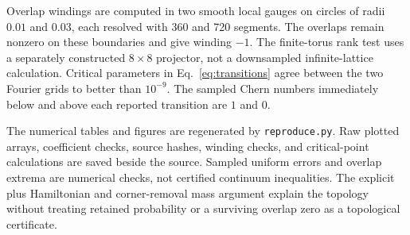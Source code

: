\documentclass[aps,prb,onecolumn,nofootinbib,superscriptaddress]{revtex4-2}
\begin{document}
Overlap windings are computed in two smooth local gauges on circles of radii $0.01$ and $0.03$, each resolved with 360 and 720 segments. The overlaps remain nonzero on these boundaries and give winding $-1$. The finite-torus rank test uses a separately constructed $8\times8$ projector, not a downsampled infinite-lattice calculation. Critical parameters in Eq.~\eqref{eq:transitions} agree between the two Fourier grids to better than $10^{-9}$. The sampled Chern numbers immediately below and above each reported transition are $1$ and $0$.

The numerical tables and figures are regenerated by \texttt{reproduce.py}. Raw plotted arrays, coefficient checks, source hashes, winding checks, and critical-point calculations are saved beside the source. Sampled uniform errors and overlap extrema are numerical checks, not certified continuum inequalities. The explicit plus Hamiltonian and corner-removal mass argument explain the topology without treating retained probability or a surviving overlap zero as a topological certificate.



\end{document}
